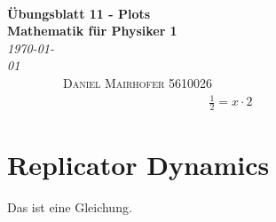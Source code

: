 \documentclass[10pt]{article}
\begin{document}
{\noindent\Huge\bf  \\[0.5\baselineskip] {\selectfont  Übungsblatt 11 - Plots}         }\\[2\baselineskip] %
{ {\bf {}\selectfont Mathematik für Physiker 1}\\ {\textit{\selectfont \today   }}}~~~~~~~~~~~~~~~~~~~~~~~~~~~~~~~~~~~~~~~~~~~~~~~~~~~~~~~~~~~~~~~~~~~~~~~~~~~~~\
{\textsc{Daniel Mairhofer 5610026}}%
\\[1.4\baselineskip] 
    
\begin{align}
                \frac 12 = x \cdot 2
\end{align}
\section{Replicator Dynamics}

Das ist eine Gleichung.
\end{document}
